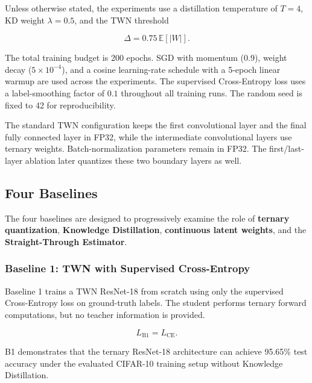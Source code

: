 \documentclass[conference]{IEEEtran}
\begin{document}
Unless otherwise stated, the experiments use a distillation
temperature of $T=4$, KD weight $\lambda=0.5$, and the TWN threshold

\begin{equation}
\Delta = 0.75\,\mathbb{E}[|W|].
\end{equation}

The total training budget is 200 epochs. SGD with momentum (0.9),
weight decay ($5\times 10^{-4}$), and a cosine learning-rate schedule
with a 5-epoch linear warmup are used across the experiments. The
supervised Cross-Entropy loss uses a label-smoothing factor of $0.1$
throughout all training runs. The random seed is fixed to 42 for
reproducibility.

The standard TWN configuration keeps the first convolutional layer and
the final fully connected layer in FP32, while the intermediate
convolutional layers use ternary weights. Batch-normalization
parameters remain in FP32. The first/last-layer ablation later
quantizes these two boundary layers as well.


\subsection{Four Baselines}

The four baselines are designed to progressively examine the role of
\textbf{ternary quantization}, \textbf{Knowledge Distillation},
\textbf{continuous latent weights}, and the
\textbf{Straight-Through Estimator}.

\subsubsection{Baseline 1: TWN with Supervised Cross-Entropy}

Baseline 1 trains a TWN ResNet-18 from scratch using only the
supervised Cross-Entropy loss on ground-truth labels. The student
performs ternary forward computations, but no teacher information is
provided.

\begin{equation}
L_{\mathrm{B1}} = L_{\mathrm{CE}}.
\end{equation}

B1 demonstrates that the ternary ResNet-18 architecture can achieve
95.65\% test accuracy under the evaluated CIFAR-10 training setup
without Knowledge Distillation.
\end{document}
